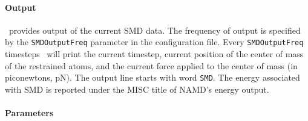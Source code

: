\paragraph*{Output}

\NAMD\ provides output of the current SMD data. The frequency of
output is specified by the {\tt SMDOutputFreq} parameter in the
configuration file. Every {\tt SMDOutputFreq} timesteps \NAMD\ will
print the current timestep, current position of the center of mass of the
restrained atoms, and
the current force applied to the center of mass (in piconewtons, pN).
The output line starts with word {\tt SMD}. The energy associated with 
SMD is reported under the MISC title of NAMD's energy output. 

\paragraph*{Parameters}

